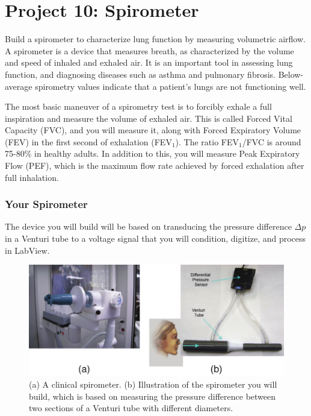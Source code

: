 \documentclass[12pt]{article}
\begin{document}
\section*{Project 10: Spirometer}

Build a spirometer to characterize lung function by measuring volumetric airflow.
A spirometer is a device that measures breath, as characterized by the volume and speed of inhaled and exhaled air.
It is an important tool in assessing lung function, and diagnosing diseases such as asthma and pulmonary fibrosis.
Below-average spirometry values indicate that a patient's lungs are not functioning well.

\par The most basic maneuver of a spirometry test is to forcibly exhale a full inspiration and measure
the volume of exhaled air.
This is called Forced Vital Capacity (FVC), and you will measure it, 
along with Forced Expiratory Volume (FEV) in the first second
of exhalation (FEV$_1$). 
The ratio FEV$_1$/FVC is around 75-80\% in healthy adults.
In addition to this, you will measure Peak Expiratory Flow (PEF), 
which is the maximum flow rate achieved by forced exhalation after full inhalation.


\subsubsection*{Your Spirometer}
The device you will build will be based on transducing the pressure difference $\Delta p$ in a Venturi tube to a voltage signal that you will
condition, digitize, and process in LabView.
\begin{figure}[!h]
\begin{center}
\includegraphics[width=\textwidth,trim=0 0 0 0,clip=false]{spirometerillustration.pdf}
\caption{(a) A clinical spirometer. (b) Illustration of the spirometer you will build, 
which is based on measuring the pressure difference between two sections of a Venturi tube
with different diameters.}
\label{fig:spirometer}
\end{center}
\end{figure}
\end{document}
